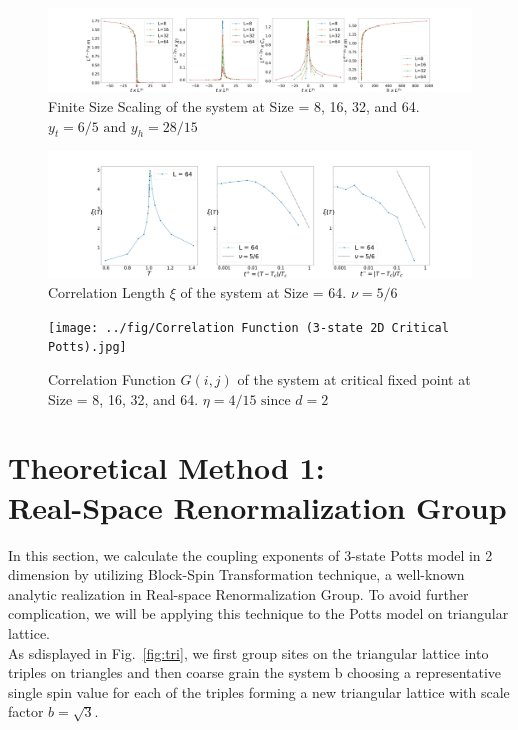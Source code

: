 \documentclass[%
 reprint,
 amsmath,amssymb,
 aps,
]{revtex4-2}
\begin{document}
\begin{figure}[b]
\includegraphics[width=1\textwidth]{../fig/Finite Size Scaling (3-state 2D Potts).jpg}
\caption{\label{fig:fss} Finite Size Scaling of the system at Size = 8, 16, 32, and 64. 
$y_{t} = 6/5 \text{ and } y_{h} = 28/15$}
\end{figure}

\begin{figure}[b]
\includegraphics[width=1\textwidth]{../fig/Correlation Length (3-state 2D Potts).jpg}
\caption{\label{fig:corrlength} Correlation Length $\xi$ of the system at Size = 64. 
$\nu = 5/6$}
\end{figure}

\begin{figure}[b]
\texttt{[image: ../fig/Correlation Function (3-state 2D Critical 
Potts).jpg]}
\caption{\label{fig:corrfunc} Correlation Function $G(i,j)$ of the system at critical 
fixed point at Size = 8, 16, 32, and 64. $\eta = 4/15 \text{ since } d = 2$}
\end{figure}

\section{\label{sec:rsrg}Theoretical Method 1: \\ Real-Space Renormalization Group}
In this section, we calculate the coupling exponents of 3-state Potts model in 2 dimension 
by utilizing Block-Spin Transformation technique, a well-known analytic realization in 
Real-space Renormalization Group. To avoid further complication, we will be applying this 
technique to the Potts model on triangular lattice. \\

As sdisplayed in Fig.~\ref{fig:tri}, we first group sites on the triangular lattice into 
triples on triangles and then coarse grain the system b choosing a representative single 
spin value for each of the triples forming a new triangular lattice with scale factor 
$b=\sqrt 3$. \\
\end{document}
